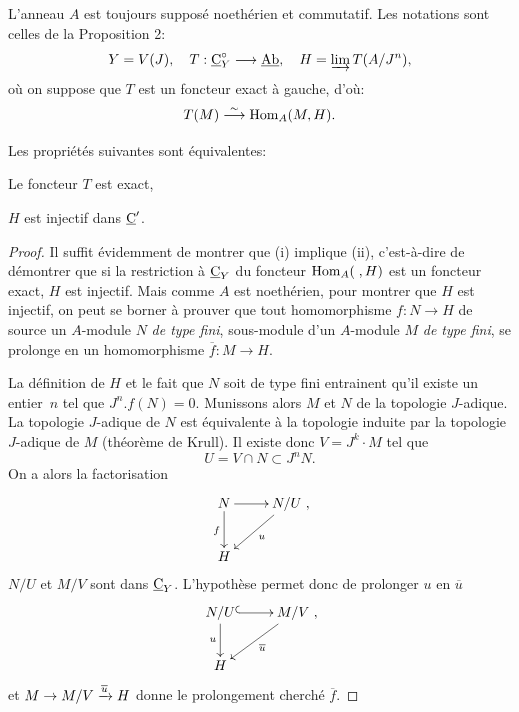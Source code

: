 L'anneau $A$ est toujours suppos\'e noeth\'erien et commutatif. Les notations sont celles de la Proposition 2:
\begin{equation*} Y=V(J), \quad T:\ccat_{Y}^{\circ}\to \Ab, \quad H=\varinjlim T(A/J^{n}),
\end{equation*}
o\`u on suppose que $T$ est un foncteur exact \`a gauche, d'o\`u:
\begin{equation*} T(M)\overset{\sim}{\longrightarrow} \operatorname{Hom}_{A}(M, H).
\end{equation*}

\begin{proposition} \label{IV.2.1}
Les propri\'et\'es suivantes sont \'equivalentes:
\begin{enumeratei}
\item
Le foncteur $T$ est exact,

\item
$H$ est injectif dans $\underline{\mathrm{C}}'$.
\end{enumeratei}
\end{proposition}

\begin{proof}
Il suffit \'evidemment de montrer que (i) implique (ii), c'est-\`a-dire de d\'emontrer que si la restriction \`a $\underline{\mathrm{C}}_{Y}$ du foncteur $\operatorname{Hom}_{A}(\;, H)$ est un foncteur exact, $H$ est injectif. Mais comme $A$ est noeth\'erien, pour montrer que $H$ est injectif, on peut se borner \`a prouver que tout homomorphisme $f:N\to H$ de source un $A$-module $N$ \emph{de type fini}, sous-module d'un $A$-module $M$ \emph{de type fini}, se prolonge en un homomorphisme $\overline{f}:M\to H$.

La d\'efinition de $H$ et le fait que $N$ soit de type fini entrainent qu'il existe un entier~$n$ tel que $J^{n}.f(N)=0$. Munissons alors $M$ et $N$ de la topologie $J$-adique. La topologie $J$-adique de $N$ est \'equivalente \`a la topologie induite par la topologie $J$-adique de $M$ (th\'eor\`eme de Krull). Il existe donc $V=J^{k}\cdot M$ tel que
\begin{equation*} U=V\cap N\subset J^{n}N.
\end{equation*}
On a alors la factorisation
$$
\xymatrix{ N\ar_{f}[d]\ar[r]&N/U\ar^{u}[dl]\\
H&},
$$
$N/U$ et $M/V$ sont dans $\underline{\mathrm{C}}_{Y}$. L'hypoth\`ese permet donc de prolonger $u$ en $\overline{u}$
$$
\xymatrix{ N/U\ar_{u}[d]\ar@{^{(}->}[r]&M/V\ar^{\overline{u}}[dl]\\
H&},
$$
et $M\to M/V\lto{\overline{u}} H$ donne le prolongement cherch\'e $\overline{f}$.
\skipqed
\end{proof}

